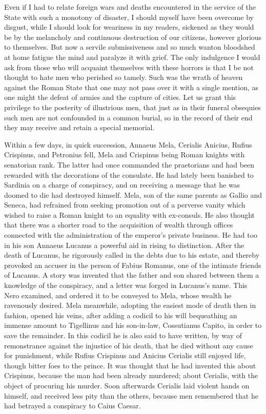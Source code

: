 
Even if I had to relate foreign wars and deaths encountered in the service of the State with such a monotony of disaster, I should myself have been overcome by disgust, while I should look for weariness in my readers, sickened as they would be by the melancholy and continuous destruction of our citizens, however glorious to themselves. But now a servile submissiveness and so much wanton bloodshed at home fatigue the mind and paralyze it with grief. The only indulgence I would ask from those who will acquaint themselves with these horrors is that I be not thought to hate men who perished so tamely. Such was the wrath of heaven against the Roman State that one may not pass over it with a single mention, as one might the defeat of armies and the capture of cities. Let us grant this privilege to the posterity of illustrious men, that just as in their funeral obsequies such men are not confounded in a common burial, so in the record of their end they may receive and retain a special memorial.


Within a few days, in quick succession, Annaeus Mela, Cerialis Anicius, Rufius Crispinus, and Petronius fell, Mela and Crispinus being Roman knights with senatorian rank. The latter had once commanded the praetorians and had been rewarded with the decorations of the consulate. He had lately been banished to Sardinia on a charge of conspiracy, and on receiving a message that he was doomed to die had destroyed himself. Mela, son of the same parents as Gallio and Seneca, had refrained from seeking promotion out of a perverse vanity which wished to raise a Roman knight to an equality with ex-consuls. He also thought that there was a shorter road to the acquisition of wealth through offices connected with the administration of the emperor's private business. He had too in his son Annaeus Lucanus a powerful aid in rising to distinction. After the death of Lucanus, he rigorously called in the debts due to his estate, and thereby provoked an accuser in the person of Fabius Romanus, one of the intimate friends of Lucanus. A story was invented that the father and son shared between them a knowledge of the conspiracy, and a letter was forged in Lucanus's name. This Nero examined, and ordered it to be conveyed to Mela, whose wealth he ravenously desired. Mela meanwhile, adopting the easiest mode of death then in fashion, opened his veins, after adding a codicil to his will bequeathing an immense amount to Tigellinus and his son-in-law, Cossutianus Capito, in order to save the remainder. In this codicil he is also said to have written, by way of remonstrance against the injustice of his death, that he died without any cause for punishment, while Rufius Crispinus and Anicius Cerialis still enjoyed life, though bitter foes to the prince. It was thought that he had invented this about Crispinus, because the man had been already murdered; about Cerialis, with the object of procuring his murder. Soon afterwards Cerialis laid violent hands on himself, and received less pity than the others, because men remembered that he had betrayed a conspiracy to Caius Caesar.

